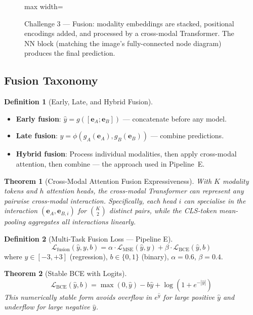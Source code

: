 \documentclass[12pt,a4paper]{article}
\theoremstyle{definition}
\newtheorem{definition}{Definition}[section]
\theoremstyle{plain}
\newtheorem{theorem}{Theorem}[section]
\theoremstyle{remark}
\newcommand{\eA}{\mathbf{e}_A}
\newcommand{\eB}{\mathbf{e}_B}
\begin{document}
\begin{figure}[H]
\begin{adjustbox}{max width=\textwidth}
\end{adjustbox}
\caption{Challenge 3 — Fusion: modality embeddings are stacked, positional encodings added, and processed by a cross-modal Transformer. The NN block (matching the image's fully-connected node diagram) produces the final prediction.}
\label{fig:fusion}
\end{figure}

\subsection{Fusion Taxonomy}

\begin{definition}[Early, Late, and Hybrid Fusion]
\begin{itemize}[nosep]
  \item \textbf{Early fusion}: $\hat{y} = g([\eA; \eB])$ — concatenate before any model.
  \item \textbf{Late fusion}: $\hat{y} = \phi(g_A(\eA), g_B(\eB))$ — combine predictions.
  \item \textbf{Hybrid fusion}: Process individual modalities, then apply cross-modal attention, then combine — the approach used in Pipeline~E.
\end{itemize}
\end{definition}

\begin{theorem}[Cross-Modal Attention Fusion Expressiveness]
With $K$ modality tokens and $h$ attention heads, the cross-modal Transformer can represent any pairwise cross-modal interaction. Specifically, each head $i$ can specialise in the interaction $(\eA, \mathbf{e}_{B,i})$ for $\binom{K}{2}$ distinct pairs, while the CLS-token mean-pooling aggregates all interactions linearly.
\end{theorem}

\begin{definition}[Multi-Task Fusion Loss — Pipeline E]
\[
  \mathcal{L}_{\text{fusion}}(\hat{y}, y, b) = \alpha \cdot \mathcal{L}_{\text{MSE}}(\hat{y}, y) + \beta \cdot \mathcal{L}_{\text{BCE}}(\hat{y}, b)
\]
where $y \in [-3,+3]$ (regression), $b \in \{0,1\}$ (binary), $\alpha=0.6$, $\beta=0.4$.
\end{definition}

\begin{theorem}[Stable BCE with Logits]
\[
  \mathcal{L}_{\text{BCE}}(\hat{y}, b) = \max(0, \hat{y}) - b\hat{y} + \log(1 + e^{-|\hat{y}|})
\]
This numerically stable form avoids overflow in $e^{\hat{y}}$ for large positive $\hat{y}$ and underflow for large negative $\hat{y}$.
\end{theorem}
\end{document}

